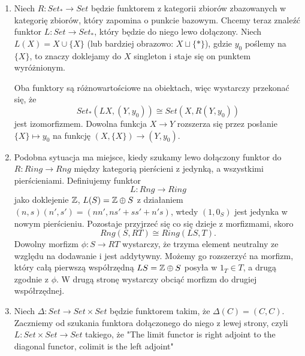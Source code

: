\begin{enumerate}
  \item Niech $R:Set_*\to Set$ będzie funktorem z kategorii zbiorów zbazowanych w kategorię zbiorów, który zapomina o punkcie bazowym. Chcemy teraz znaleźć funktor $L:Set\to Set_*$, który będzie do niego lewo dołączony. Niech $L(X)=X\cup\{X\}$ (lub bardziej obrazowo: $X\sqcup\{*\}$), gdzie $y_0$ poślemy na $\{X\}$, to znaczy doklejamy do $X$ singleton i staje się on punktem wyróżnionym. 

    Oba funktory są różnowartościowe na obiektach, więc wystarczy przekonać się, że
    $$Set_*(LX, (Y, y_0))\cong Set(X, R(Y, y_0))$$
    jest izomorfizmem. Dowolna funkcja $X\to Y$ rozszerza się przez posłanie $\{X\}\mapsto y_0$ na funkcję $(X, \{X\})\to (Y, y_0)$.
  \item Podobna sytuacja ma miejsce, kiedy szukamy lewo dołączony funktor do $R:Ring\to Rng$ między kategorią pierścieni z jedynką, a wszystkimi pierścieniami. Definiujemy funktor 
    $$L:Rng\to Ring$$
    jako doklejenie $\mathbb{Z}$, $L(S)=\mathbb{Z}\oplus S$ z działaniem $(n, s)(n', s')=(nn', ns'+ss'+n's)$, wtedy $(1, 0_S)$ jest jedynka w nowym pierścieniu. Pozostaje przyjrzeć się co się dzieje z morfizmami, skoro
    $$Rng(S, RT)\cong Ring(LS, T).$$
    Dowolny morfizm $\phi:S\to RT$ wystarczy, że trzyma element neutralny ze względu na dodawanie i jest addytywny. Możemy go rozszerzyć na morfizm, który całą pierwszą współrzędną $LS=\mathbb{Z}\oplus S$ posyła w $1_T\in T$, a drugą zgodnie z $\phi$. W drugą stronę wystarczy obciąć morfizm do drugiej współrzędnej.
  \item Niech $\Delta:Set\to Set\times Set$ będzie funktorem takim, że  $\Delta(C)=(C, C)$. Zaczniemy od szukania funktora dołączonego do niego z lewej strony, czyli $L:Set\times Set\to Set$ takiego, że
    "The limit functor is right adjoint to the diagonal functor, colimit is the left adjoint"
\end{enumerate}
\bigskip

